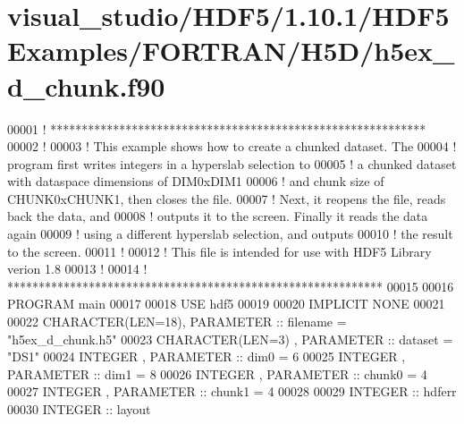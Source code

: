 \hypertarget{visual__studio_2_h_d_f5_21_810_81_2_h_d_f5_examples_2_f_o_r_t_r_a_n_2_h5_d_2h5ex__d__chunk_8f90_source}{}\section{visual\+\_\+studio/\+H\+D\+F5/1.10.1/\+H\+D\+F5\+Examples/\+F\+O\+R\+T\+R\+A\+N/\+H5\+D/h5ex\+\_\+d\+\_\+chunk.f90}
\label{visual__studio_2_h_d_f5_21_810_81_2_h_d_f5_examples_2_f_o_r_t_r_a_n_2_h5_d_2h5ex__d__chunk_8f90_source}

\begin{DoxyCode}
00001 \textcolor{comment}{! ************************************************************}
00002 \textcolor{comment}{!}
00003 \textcolor{comment}{!  This example shows how to create a chunked dataset.  The}
00004 \textcolor{comment}{!  program first writes integers in a hyperslab selection to}
00005 \textcolor{comment}{!  a chunked dataset with dataspace dimensions of DIM0xDIM1}
00006 \textcolor{comment}{!  and chunk size of CHUNK0xCHUNK1, then closes the file.}
00007 \textcolor{comment}{!  Next, it reopens the file, reads back the data, and}
00008 \textcolor{comment}{!  outputs it to the screen.  Finally it reads the data again}
00009 \textcolor{comment}{!  using a different hyperslab selection, and outputs}
00010 \textcolor{comment}{!  the result to the screen.}
00011 \textcolor{comment}{!}
00012 \textcolor{comment}{!  This file is intended for use with HDF5 Library verion 1.8}
00013 \textcolor{comment}{!}
00014 \textcolor{comment}{! ************************************************************}
00015 
00016 \textcolor{keyword}{PROGRAM} main
00017 
00018   \textcolor{keywordtype}{USE }hdf5
00019 
00020   \textcolor{keywordtype}{IMPLICIT NONE}
00021 
00022   \textcolor{keywordtype}{CHARACTER(LEN=18)}, \textcolor{keywordtype}{PARAMETER} :: filename = \textcolor{stringliteral}{"h5ex\_d\_chunk.h5"}
00023   \textcolor{keywordtype}{CHARACTER(LEN=3)} , \textcolor{keywordtype}{PARAMETER} :: dataset  = \textcolor{stringliteral}{"DS1"}
00024   \textcolor{keywordtype}{INTEGER}          , \textcolor{keywordtype}{PARAMETER} :: dim0     = 6
00025   \textcolor{keywordtype}{INTEGER}          , \textcolor{keywordtype}{PARAMETER} :: dim1     = 8
00026   \textcolor{keywordtype}{INTEGER}          , \textcolor{keywordtype}{PARAMETER} :: chunk0   = 4
00027   \textcolor{keywordtype}{INTEGER}          , \textcolor{keywordtype}{PARAMETER} :: chunk1   = 4
00028 
00029   \textcolor{keywordtype}{INTEGER} :: hdferr
00030   \textcolor{keywordtype}{INTEGER} :: layout

\end{DoxyCode}
